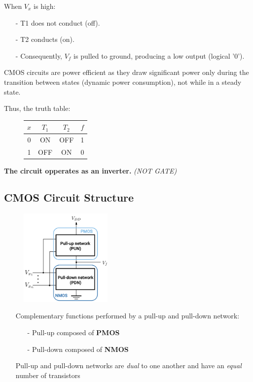 \documentclass[12pt,openany, tikz,border=10pt]{book}
\begin{document}
  When \( V_x \) is high:
  \begin{itemize}
    \item[-] T1 does not conduct (off).
    \item[-] T2 conducts (on).
    \item[-] Consequently, \( V_f \) is pulled to ground, producing a low output (logical '0').
  \end{itemize}
  
  CMOS circuits are power efficient as they draw significant power only during the transition between states (dynamic power consumption), not while in a steady state.
  
  \vspace*{10px}

  Thus, the truth table:
  \begin{figure}[h]
\centering
\begin{tabular}{c|c|c|c}
    \( x \) & \( T_1 \) & \( T_2 \) & \( f \) \\
    \hline
    0 & ON  & OFF & 1 \\
    1 & OFF & ON  & 0 \\
\end{tabular}
\end{figure}


\textbf{The circuit opperates as an inverter. } \textit{(NOT GATE)}

\newpage
\subsection{CMOS Circuit Structure}
\begin{figure}[h]
\centering
\includegraphics[width=0.4\textwidth]{circuits/9.1.4.png} %
\end{figure}

\begin{itemize}
  \item[] Complementary functions performed by a pull-up and pull-down network:
  \begin{itemize}
    \item[-] Pull-up composed of \textbf{PMOS}
    \item[-] Pull-down composed of \textbf{NMOS}
  \end{itemize}
  \item[] Pull-up and pull-down networks are \textit{dual} to one another and have an \textit{equal} number of transistors
\end{itemize}
\end{document}
